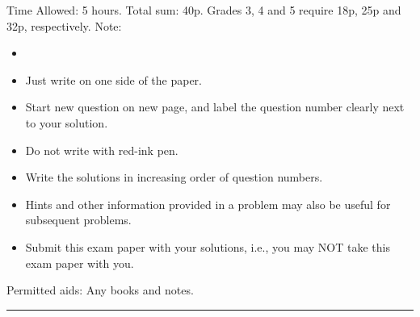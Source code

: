\documentclass[11pt,paper=a4,abstract=on,parskip=half,DIV=calc,compact]{scrartcl}
\begin{document}
\thispagestyle{scrheadings}
\chead{}
\ifoot{}
\cfoot{}
\ofoot{}
\setheadsepline{1pt}

Time Allowed: 5 hours. Total sum: 40p. Grades 3, 4 and 5 require 18p, 25p and 32p, respectively.
Note:
\begin{itemize}[noitemsep,topsep=0pt,parsep=0pt,partopsep=0pt]
	\item {}
  \vspace{1mm}
\item Just write on one side of the paper.
\item Start new question on new page, and label the question number clearly next to your solution.
\item Do not write with red-ink pen.
\item Write the solutions in increasing order of question numbers.
\item Hints and other information provided in a problem may also be useful for subsequent problems.
\item Submit this exam paper with your solutions, i.e., you may NOT take this exam paper with you.  
\end{itemize}
Permitted aids: Any books and notes.
\vspace{-0.2\baselineskip} \newline{}\rule{\textwidth}{1pt}
\end{document}
